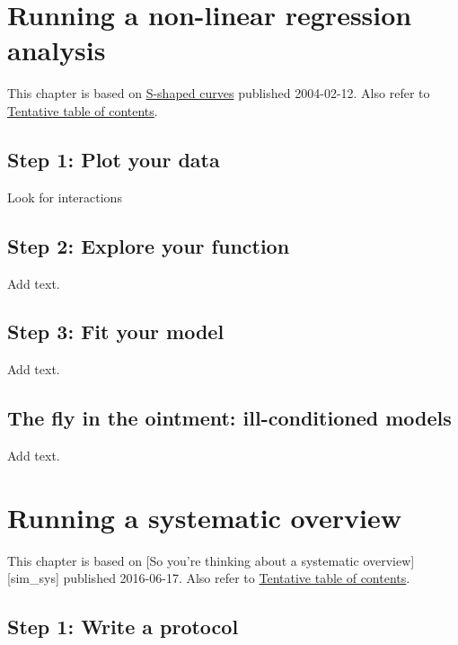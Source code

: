 \documentclass[
  letterpaper,
  DIV=11,
  numbers=noendperiod]{scrreprt}
\begin{document}
\chapter{Running a non-linear regression
analysis}\label{running-a-non-linear-regression-analysis}

This chapter is based on
\href{http://new.pmean.com/fitting-s-shaped-curves/}{S-shaped curves}
published 2004-02-12. Also refer to
\href{http://www.pmean.com/10/Contents.html}{Tentative table of
contents}.

\section{Step 1: Plot your data}\label{step-1-plot-your-data-1}

Look for interactions

\section{Step 2: Explore your
function}\label{step-2-explore-your-function}

Add text.

\section{Step 3: Fit your model}\label{step-3-fit-your-model}

Add text.

\section{The fly in the ointment: ill-conditioned
models}\label{the-fly-in-the-ointment-ill-conditioned-models}

Add text.


\chapter{Running a systematic
overview}\label{running-a-systematic-overview}

This chapter is based on {[}So you're thinking about a systematic
overview{]}{[}sim\_sys{]} published 2016-06-17. Also refer to
\href{http://www.pmean.com/10/Contents.html}{Tentative table of
contents}.

\section{Step 1: Write a protocol}\label{step-1-write-a-protocol}
\end{document}

